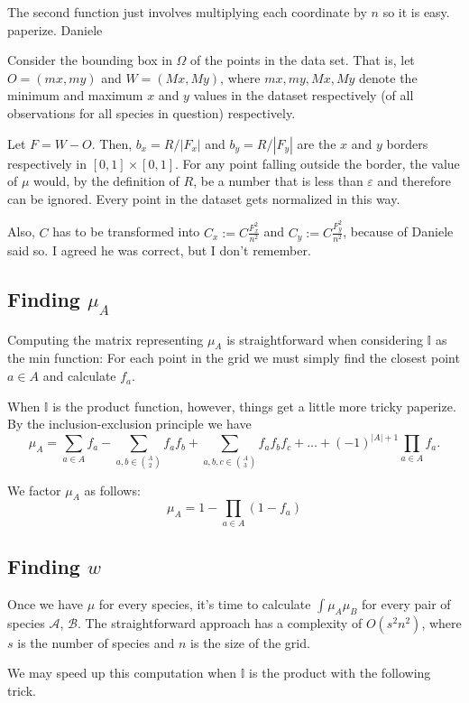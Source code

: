 \documentclass[12pt]{article}
\numberwithin{equation}{section} %
\numberwithin{figure}{section} %
\def\cA{{\mathcal{A}}}
\def\cB{{\mathcal{B}}}
\def\II{{\mathbb{I}}}
\theoremstyle{definition}
\def\tcr#1{\textcolor{MyRed}{#1}}
\begin{document}
	The second function just involves multiplying each coordinate by $n$ so it is easy. \tcr{paperize. Daniele} 
	
	Consider the bounding box in $\Omega$ of the points in the data set. That is, let $O=(mx,my)$ and $W=(Mx,My)$, where $mx,my,Mx,My$ denote the minimum and maximum $x$ and $y$ values in the dataset respectively (of all observations for all species in question) respectively.
	
	Let $F=W-O$. Then, $b_x = R/|F_x|$ and $b_y = R/|F_y|$ are the $x$ and $y$ borders respectively in $[0,1]\times[0,1]$. For any point falling outside the border, the value of $\mu$ would, by the definition of $R$, be a number that is less than $\varepsilon$ and therefore can be ignored. Every point in the dataset gets normalized in this way.
	
	Also, $C$ has to be transformed into $C_x := C\frac{F_x^2}{n^2}$ and $C_y :=  C\frac{F_y^2}{n^2}$, because of \tcr{Daniele said so. I agreed he was correct, but I don't remember.}

\subsection{Finding \texorpdfstring{$\mu_A$}{mu\_A}}
Computing the matrix representing $\mu_A$ is straightforward when considering $\II$ as the min function: For each point in the grid we must simply find the closest point $a\in A$ and calculate $f_a$.

When $\II$ is the product function, however, things get a little more tricky \tcr{paperize}. By the inclusion-exclusion principle we have
	$$\mu_A = \sum_{a\in A} f_{a} - \sum_{a,b \in \binom{A}{2}} f_a f_b + \sum_{a,b,c \in \binom{A}{3} } f_a f_{b} f_{c} + \dots + (-1)^{|A|+1} \prod_{a\in A} f_a.$$

	We factor $\mu_A$ as follows:
$$\mu_A = 1-\prod_{a\in A} (1-f_a)$$

	

	\subsection{Finding \texorpdfstring{$w$}{w}}
	
	Once we have $\mu$ for every species, it's time to calculate $\int \mu_A\mu_B$ for every pair of species $\cA$, $\cB$. The straightforward approach has a complexity of $O(s^2n^2)$, where $s$ is the number of species and $n$ is the size of the grid.
	
	We may speed up this computation when $\II$ is the product with the following trick. 
	
\end{document}
